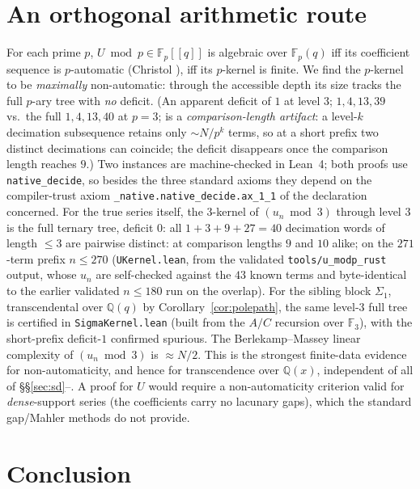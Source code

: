 \documentclass[11pt]{article}
\theoremstyle{plain}
\theoremstyle{definition}
\theoremstyle{remark}
\newcommand{\Q}{\mathbb{Q}}
\newcommand{\F}{\mathbb{F}}
\begin{document}
\section{An orthogonal arithmetic route}\label{sec:modp}

For each prime $p$, $U\bmod p\in\F_p[[q]]$ is algebraic over $\F_p(q)$ iff its coefficient sequence
is $p$-automatic (Christol \cite{Christol1979,CKMR1980}), iff its $p$-kernel is finite. We find the $p$-kernel
to be \emph{maximally} non-automatic: through the accessible depth its size tracks the full $p$-ary
tree with \emph{no} deficit. (An apparent deficit of $1$ at level $3$; $1,4,13,39$ vs.\ the full
$1,4,13,40$ at $p=3$; is a \emph{comparison-length artifact}: a level-$k$ decimation subsequence
retains only $\sim N/p^{k}$ terms, so at a short prefix two distinct decimations can coincide; the
deficit disappears once the comparison length reaches $9$.) Two instances are machine-checked in
Lean~4; both proofs use \texttt{native\_decide}, so besides the three standard axioms they depend
on the compiler-trust axiom \texttt{\_native.native\_decide.ax\_1\_1} of the declaration concerned.
For the true series itself, the $3$-kernel of $(u_n\bmod3)$ through level $3$ is the full
ternary tree, deficit $0$: all $1+3+9+27=40$ decimation words of length $\le3$ are pairwise distinct: at comparison lengths $9$ and $10$ alike; on the $271$-term prefix $n\le270$
(\texttt{UKernel.lean}, from the validated \texttt{tools/u\_modp\_rust} output, whose $u_n$ are
self-checked against the $43$ known terms and byte-identical to the earlier validated $n\le180$ run
on the overlap). For the sibling block $\Sigma_1$, transcendental over $\Q(q)$ by
Corollary~\ref{cor:polepath}, the same level-$3$ full tree is certified in \texttt{SigmaKernel.lean}
(built from the $A/C$ recursion over $\F_3$), with the short-prefix deficit-$1$ confirmed spurious. The Berlekamp--Massey \cite{Massey1969} linear complexity of $(u_n\bmod 3)$ is $\approx N/2$. This is the
strongest finite-data evidence for non-automaticity, and hence for transcendence over $\Q(x)$,
independent of all of \S\S\ref{sec:sd}--{\cite[\textup{sec:U}]{Bonfioli2026bA}}. A proof for $U$ would require a non-automaticity
criterion valid for \emph{dense}-support series (the coefficients carry no lacunary gaps), which
the standard gap/Mahler methods do not provide.

\section{Conclusion}\label{sec:conclusion}
\end{document}
